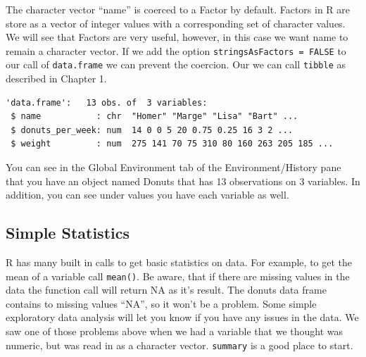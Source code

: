 \documentclass[]{book}
\newenvironment{Shaded}{\begin{snugshade}}{\end{snugshade}}
\newcommand{\DataTypeTok}[1]{\textcolor[rgb]{0.13,0.29,0.53}{#1}}
\newcommand{\KeywordTok}[1]{\textcolor[rgb]{0.13,0.29,0.53}{\textbf{#1}}}
\newcommand{\NormalTok}[1]{#1}
\newcommand{\OperatorTok}[1]{\textcolor[rgb]{0.81,0.36,0.00}{\textbf{#1}}}
\newcommand{\OtherTok}[1]{\textcolor[rgb]{0.56,0.35,0.01}{#1}}
\newcommand{\StringTok}[1]{\textcolor[rgb]{0.31,0.60,0.02}{#1}}
\begin{document}
The character vector ``name'' is coerced to a Factor by default. Factors in R are store as a vector of integer values with a corresponding set of character values. We will see that Factors are very useful, however, in this case we want name to remain a character vector. If we add the option \texttt{stringsAsFactors\ =\ FALSE} to our call of \texttt{data.frame} we can prevent the coercion. Our we can call \texttt{tibble} as described in Chapter 1.

\begin{Shaded}
\end{Shaded}

\begin{verbatim}
'data.frame':   13 obs. of  3 variables:
 $ name           : chr  "Homer" "Marge" "Lisa" "Bart" ...
 $ donuts_per_week: num  14 0 0 5 20 0.75 0.25 16 3 2 ...
 $ weight         : num  275 141 70 75 310 80 160 263 205 185 ...
\end{verbatim}

You can see in the Global Environment tab of the Environment/History pane that you have an object named Donuts that has 13 observations on 3 variables. In addition, you can see under values you have each variable as well.

\hypertarget{simple-statistics}{%
\subsection{Simple Statistics}\label{simple-statistics}}

R has many built in calls to get basic statistics on data. For example, to get the mean of a variable call \texttt{mean()}. Be aware, that if there are missing values in the data the function call will return NA as it's result. The donuts data frame contains to missing values ``NA'', so it won't be a problem. Some simple exploratory data analysis will let you know if you have any issues in the data. We saw one of those problems above when we had a variable that we thought was numeric, but was read in as a character vector. \texttt{summary} is a good place to start.

\begin{Shaded}
\end{Shaded}
\end{document}
